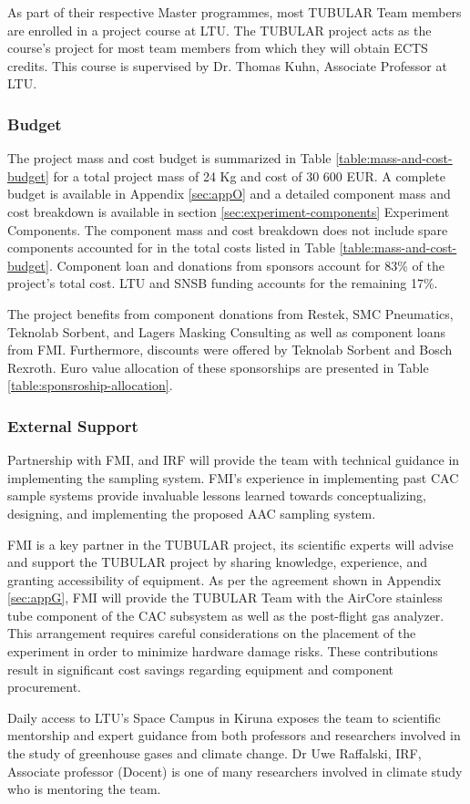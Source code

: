 As part of their respective Master programmes, most TUBULAR Team members are enrolled in a project course at LTU. The TUBULAR project acts as the course's project for most team members from which they will obtain ECTS credits. This course is supervised by Dr. Thomas Kuhn, Associate Professor at LTU.

\pagebreak
\subsubsection{Budget}
\label{sec:3.2.2}
The project mass and cost budget is summarized in Table \ref{table:mass-and-cost-budget} for a total project mass of 24 Kg and cost of 30 600 EUR. A complete budget is available in Appendix \ref{sec:appO} and a detailed component mass and cost breakdown is available in section \ref{sec:experiment-components} Experiment Components. The component mass and cost breakdown does not include spare components accounted for in the total costs listed in Table \ref{table:mass-and-cost-budget}. Component loan and donations from sponsors account for 83\% of the project's total cost. LTU and SNSB funding accounts for the remaining 17\%. 



The project benefits from component donations from Restek, SMC Pneumatics, Teknolab Sorbent, and Lagers Masking Consulting as well as component loans from FMI. Furthermore, discounts were offered by Teknolab Sorbent and Bosch Rexroth. Euro value allocation of these sponsorships are presented in Table \ref{table:sponsroship-allocation}.




\subsubsection{External Support}

Partnership with FMI, and IRF will provide the team with technical guidance in implementing the sampling system. FMI’s experience in implementing past CAC sample systems provide invaluable lessons learned towards conceptualizing, designing, and implementing the proposed AAC sampling system.

FMI is a key partner in the TUBULAR project, its scientific experts will advise and support the TUBULAR project by sharing knowledge, experience, and granting accessibility of equipment. As per the agreement shown in Appendix \ref{sec:appG}, FMI will provide the TUBULAR Team with the AirCore stainless tube component of the CAC subsystem as well as the post-flight gas analyzer. This arrangement requires careful considerations on the placement of the experiment in order to minimize hardware damage risks. These contributions result in significant cost savings regarding equipment and component procurement.

Daily access to LTU's Space Campus in Kiruna exposes the team to scientific mentorship and expert guidance from both professors and researchers involved in the study of greenhouse gases and climate change. Dr Uwe Raffalski, IRF, Associate professor (Docent) is one of many researchers involved in climate study who is mentoring the team.